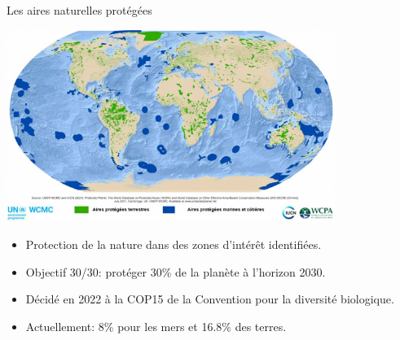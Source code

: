 \documentclass[10pt,table,dvipsnames,compress]{beamer}
\begin{document}
\begin{frame}[label={sec:orgef8475d}]{Les aires naturelles protégées}
\begin{center}
\includegraphics[width=0.8\textwidth]{figs/carte-aires-protegees.jpg}
\end{center}

\begin{itemize}
\item Protection de la nature dans des zones d'intérêt identifiées.
\item Objectif 30/30: protéger 30\% de la planète à l'horizon 2030.
\item Décidé en 2022 à la COP15 de la Convention pour la diversité biologique.
\item Actuellement: 8\% pour les mers et 16.8\% des terres.
\end{itemize}
\end{frame}
\end{document}
